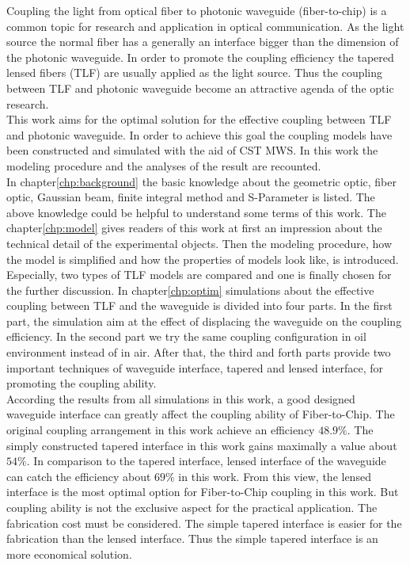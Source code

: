 
Coupling the light from optical fiber to photonic waveguide (fiber-to-chip) is a common topic for research and application in optical communication. As the light source the normal fiber has a generally an interface bigger than the dimension of the photonic waveguide. In order to promote the coupling efficiency the tapered lensed fibers (TLF) are usually applied as the light source. Thus the coupling between TLF and photonic waveguide become an attractive agenda of the optic research. \\ 
This work aims for the optimal solution for the effective coupling between TLF and photonic waveguide. In order to achieve this goal the coupling models have been constructed and simulated with the aid of CST MWS. In this work the modeling procedure and the analyses of the result are recounted.\\
In chapter\ref{chp:background} the basic knowledge about the geometric optic, fiber optic, Gaussian beam, finite integral method and S-Parameter is listed. The above knowledge could be helpful to understand some terms of this work. The chapter\ref{chp:model} gives readers of this work at first an impression about the technical detail of the experimental objects. Then the modeling procedure, how the model is simplified and how the properties of models look like, is introduced. Especially, two types of TLF models are compared and one is finally chosen for the further discussion. In chapter\ref{chp:optim} simulations about the effective coupling between TLF and the waveguide is divided into four parts. In the first part, the simulation aim at the effect of displacing the waveguide on the coupling efficiency. In the second part we try the same coupling configuration in oil environment instead of in air. After that, the third and forth parts provide two important techniques of waveguide interface, tapered and lensed interface, for promoting the coupling ability.\\         
According the results from all simulations in this work, a good designed waveguide interface can greatly affect the coupling ability of Fiber-to-Chip. The original coupling arrangement in this work achieve an efficiency $48.9\%$. The simply constructed tapered interface in this work gains maximally a value about $54\%$. In comparison to the tapered interface, lensed interface of the waveguide can catch the efficiency about $69\%$ in this work. From this view, the lensed interface is the most optimal option for Fiber-to-Chip coupling in this work. But coupling ability is not the exclusive aspect for the practical application. The fabrication cost must be considered. The simple tapered interface is easier for the fabrication than the lensed interface. Thus the simple tapered interface is an more economical solution. \\       
